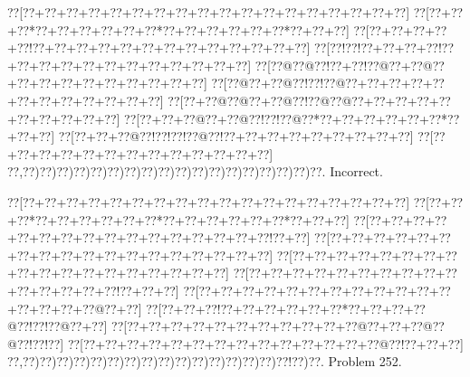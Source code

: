 \documentclass[a5paper]{article}
\begin{document}
\begin{center}
{\goo
\0??[\0??+\0??+\0??+\0??+\0??+\0??+\0??+\0??+\0??+\0??+\0??+\0??+\0??+\0??+\0??+\0??+\0??+\0??]
\0??[\0??+\0??+\0??*\0??+\0??+\0??+\0??+\0??+\0??*\0??+\0??+\0??+\0??+\0??+\0??*\0??+\0??+\0??]
\0??[\0??+\0??+\0??+\0??+\0??!\0??+\0??+\0??+\0??+\0??+\0??+\0??+\0??+\0??+\0??+\0??+\0??+\0??]
\0??[\0??!\0??!\0??+\0??+\0??+\0??!\0??+\0??+\0??+\0??+\0??+\0??+\0??+\0??+\0??+\0??+\0??+\0??]
\0??[\0??@\0??@\0??!\0??+\0??!\0??@\0??+\0??@\0??+\0??+\0??+\0??+\0??+\0??+\0??+\0??+\0??+\0??]
\0??[\0??@\0??+\0??@\0??!\0??!\0??@\0??+\0??+\0??+\0??+\0??+\0??+\0??+\0??+\0??+\0??+\0??+\0??]
\0??[\0??+\0??@\0??@\0??+\0??@\0??!\0??@\0??@\0??+\0??+\0??+\0??+\0??+\0??+\0??+\0??+\0??+\0??]
\0??[\0??+\0??+\0??@\0??+\0??@\0??!\0??!\0??@\0??*\0??+\0??+\0??+\0??+\0??+\0??*\0??+\0??+\0??]
\0??[\0??+\0??+\0??@\0??!\0??!\0??!\0??@\0??!\0??+\0??+\0??+\0??+\0??+\0??+\0??+\0??+\0??]
\0??[\0??+\0??+\0??+\0??+\0??+\0??+\0??+\0??+\0??+\0??+\0??+\0??+\0??]
\0??,\0??)\0??)\0??)\0??)\0??)\0??)\0??)\0??)\0??)\0??)\0??)\0??)\0??)\0??)\0??)\0??)\0??)\0??.
}
Incorrect. 

\end{center}
\newpage
\begin{center}
{\goo
\0??[\0??+\0??+\0??+\0??+\0??+\0??+\0??+\0??+\0??+\0??+\0??+\0??+\0??+\0??+\0??+\0??+\0??+\0??]
\0??[\0??+\0??+\0??*\0??+\0??+\0??+\0??+\0??+\0??*\0??+\0??+\0??+\0??+\0??+\0??*\0??+\0??+\0??]
\0??[\0??+\0??+\0??+\0??+\0??+\0??+\0??+\0??+\0??+\0??+\0??+\0??+\0??+\0??+\0??+\0??!\0??+\0??]
\0??[\0??+\0??+\0??+\0??+\0??+\0??+\0??+\0??+\0??+\0??+\0??+\0??+\0??+\0??+\0??+\0??+\0??+\0??]
\0??[\0??+\0??+\0??+\0??+\0??+\0??+\0??+\0??+\0??+\0??+\0??+\0??+\0??+\0??+\0??+\0??+\0??+\0??]
\0??[\0??+\0??+\0??+\0??+\0??+\0??+\0??+\0??+\0??+\0??+\0??+\0??+\0??+\0??+\0??!\0??+\0??+\0??]
\0??[\0??+\0??+\0??+\0??+\0??+\0??+\0??+\0??+\0??+\0??+\0??+\0??+\0??+\0??+\0??+\0??@\0??+\0??]
\0??[\0??+\0??+\0??!\0??+\0??+\0??+\0??+\0??+\0??*\0??+\0??+\0??+\0??@\0??!\0??!\0??@\0??+\0??]
\0??[\0??+\0??+\0??+\0??+\0??+\0??+\0??+\0??+\0??+\0??+\0??@\0??+\0??+\0??@\0??@\0??!\0??!\0??]
\0??[\0??+\0??+\0??+\0??+\0??+\0??+\0??+\0??+\0??+\0??+\0??+\0??+\0??+\0??@\0??!\0??+\0??+\0??]
\0??,\0??)\0??)\0??)\0??)\0??)\0??)\0??)\0??)\0??)\0??)\0??)\0??)\0??)\0??)\0??)\0??!\0??)\0??.
}
Problem 252.

\end{center}
\end{document}
